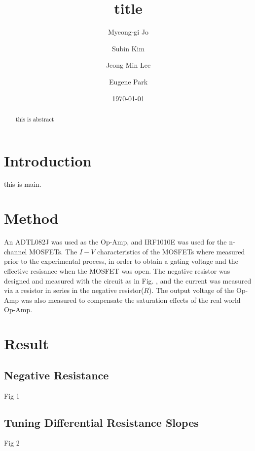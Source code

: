 \documentclass[%
 aip,
amsmath,amssymb,
reprint,
]{revtex4-1}
\begin{document}

\title[Intermediate Physics Laboratory 2, Module 2]{title}
\author{Myeong-gi Jo}
\author{Subin Kim}
\author{Jeong Min Lee}
\author{Eugene Park}

\date{\today}
\begin{abstract}
this is abstract
\end{abstract}

\maketitle

\section{\label{sec:Intro} Introduction} 
this is main. 

\section{\label{sec:Method} Method}
An ADTL082J was used as the Op-Amp, and IRF1010E was used for the n-channel MOSFETs. The $I-V$ characteristics of the MOSFETs where measured prior to the experimental process, in order to obtain a gating voltage and the effective resisance when the MOSFET was open. The negative resistor was designed and measured with the circuit as in Fig. , and the current was measured via a resistor in series in the negative resistor($R$). The output voltage of the Op-Amp was also measured to compensate the saturation effects of the real world Op-Amp. 

\section{\label{sec:Result} Result}
\subsection{Negative Resistance}
Fig 1
\subsection{Tuning Differential Resistance Slopes}
Fig 2
\end{document}
